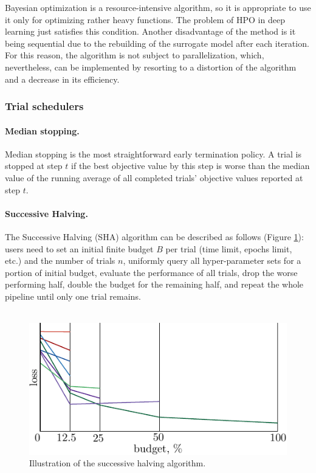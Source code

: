 \documentclass[reprint,
superscriptaddress,
amsmath,amssymb,aps,showkeys,showpacs,
twoside,final,secnumarabic,%
nofootinbib]{revtex4-2}
\begin{document}
Bayesian optimization is a resource-intensive algorithm, so it is appropriate to use it only for optimizing rather heavy functions. The problem of HPO in deep learning just satisfies this condition. Another disadvantage of the method is it being sequential due to the rebuilding of the surrogate model after each iteration. For this reason, the algorithm is not subject to parallelization, which, nevertheless, can be implemented by resorting to a distortion of the algorithm and a decrease in its efficiency.

\subsubsection{Trial schedulers}

\paragraph*{Median stopping.}
Median stopping is the most straightforward early termination policy. A trial is stopped at step $t$ if the best objective value by this step is worse than the median value of the running average of all completed trials' objective values reported at step $t$.

\paragraph*{Successive Halving.}
The Successive Halving (SHA) algorithm can be described as follows (Figure \ref{SHA}): users need to set an initial finite budget $B$ per trial (time limit, epochs limit, etc.) and the number of trials $n$, uniformly query all hyper-parameter sets for a portion of initial budget, evaluate the performance of all trials, drop the worse performing half, double the budget for the remaining half, and repeat the whole pipeline until only one trial remains.
\\
\\

\begin{figure}[h]
\includegraphics[width=\columnwidth]{img/SHA.pdf}
\caption{Illustration of the successive halving algorithm.}
\label{SHA}
\end{figure}
\end{document}
